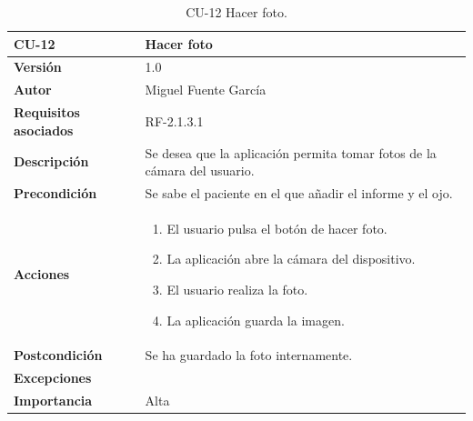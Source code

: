 \begin{table}[p]
	\centering
	\begin{tabularx}{\linewidth}{ p{} p{} }
		\toprule
		\textbf{CU-12}    & \textbf{Hacer foto}\\
		\toprule
		\textbf{Versión}              & 1.0    \\
		\textbf{Autor}                & Miguel Fuente García \\
		\textbf{Requisitos asociados} & RF-2.1.3.1 \\
		\textbf{Descripción}          & Se desea que la aplicación permita tomar fotos de la cámara del usuario. \\
		\textbf{Precondición}         & Se sabe el paciente en el que añadir el informe y el ojo. \\
		\textbf{Acciones}             &
		\begin{enumerate}
			\def\labelenumi{\arabic{enumi}.}
			\tightlist
			\item El usuario pulsa el botón de hacer foto.
            \item La aplicación abre la cámara del dispositivo.
            \item El usuario realiza la foto.
            \item La aplicación guarda la imagen.
		\end{enumerate}\\
		\textbf{Postcondición}        & Se ha guardado la foto internamente. \\
		\textbf{Excepciones}          &  \\
		\textbf{Importancia}          & Alta  \\
		\bottomrule
	\end{tabularx}
	\caption{CU-12 Hacer foto.}
\end{table}

